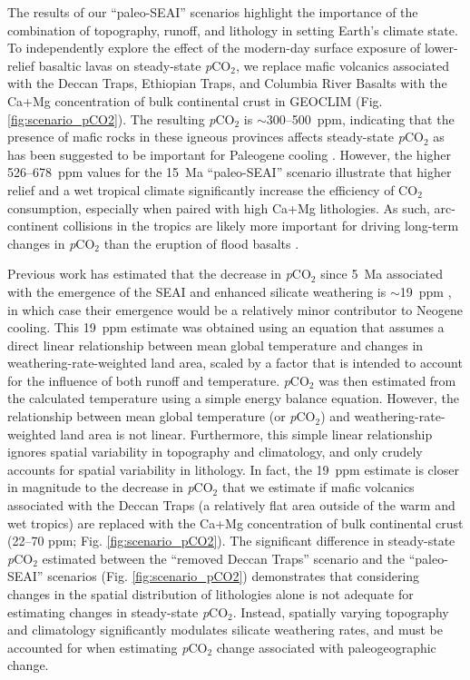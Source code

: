 \documentclass[9pt,twocolumn,twoside,lineno]{pnas-new}
\newcommand{\pCOtwo}{\textit{p}CO$_{2}$\xspace}
\newcommand{\COtwo}{CO$_{2}$\xspace}
\begin{document}
The results of our ``paleo-SEAI'' scenarios highlight the importance of the combination of topography, runoff, and lithology in setting Earth's climate state. To independently explore the effect of the modern-day surface exposure of lower-relief basaltic lavas on steady-state \pCOtwo \cite{Kent2013a}, we replace mafic volcanics associated with the Deccan Traps, Ethiopian Traps, and Columbia River Basalts with the Ca+Mg concentration of bulk continental crust in GEOCLIM (Fig. \ref{fig:scenario_pCO2}). The resulting \pCOtwo is $\sim$300--500~ppm, indicating that the presence of mafic rocks in these igneous provinces affects steady-state \pCOtwo as has been suggested to be important for Paleogene cooling \cite{Kent2013a}. However, the higher 526--678~ppm values for the 15~Ma ``paleo-SEAI'' scenario illustrate that higher relief and a wet tropical climate significantly increase the efficiency of \COtwo consumption, especially when paired with high Ca+Mg lithologies. As such, arc-continent collisions in the tropics are likely more important for driving long-term changes in \pCOtwo than the eruption of flood basalts \cite{Macdonald2019a, Park2019a}.

Previous work has estimated that the decrease in \pCOtwo since 5~Ma associated with the emergence of the SEAI and enhanced silicate weathering is $\sim$19~ppm \cite{Molnar2015a}, in which case their emergence would be a relatively minor contributor to Neogene cooling. This 19~ppm estimate was obtained using an equation that assumes a direct linear relationship between mean global temperature and changes in weathering-rate-weighted land area, scaled by a factor that is intended to account for the influence of both runoff and temperature. \pCOtwo was then estimated from the calculated temperature using a simple energy balance equation. However, the relationship between mean global temperature (or \pCOtwo) and weathering-rate-weighted land area is not linear. Furthermore, this simple linear relationship ignores spatial variability in topography and climatology, and only crudely accounts for spatial variability in lithology. In fact, the 19~ppm estimate is closer in magnitude to the decrease in \pCOtwo that we estimate if mafic volcanics associated with the Deccan Traps (a relatively flat area outside of the warm and wet tropics) are replaced with the Ca+Mg concentration of bulk continental crust (22--70 ppm; Fig. \ref{fig:scenario_pCO2}). The significant difference in steady-state \pCOtwo estimated between the ``removed Deccan Traps'' scenario and the ``paleo-SEAI'' scenarios (Fig. \ref{fig:scenario_pCO2}) demonstrates that considering changes in the spatial distribution of lithologies alone is not adequate for estimating changes in steady-state \pCOtwo. Instead, spatially varying topography and climatology significantly modulates silicate weathering rates, and must be accounted for when estimating \pCOtwo change associated with paleogeographic change.
\end{document}
